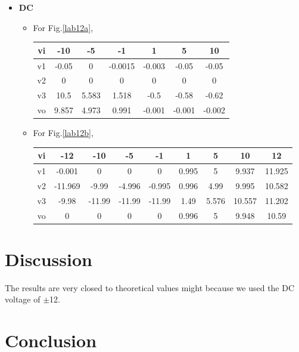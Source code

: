 \begin{itemize}
            \item \textbf{DC}
                \begin{itemize}
                    \item For Fig.\ref{lab12a},\\
                        \begin{table}[h]
                        \centering
                        \begin{tabular}{|c|c|c|c|c|c|c|}
                            \hline
                            vi & -10   & -5    & -1      & 1      & 5      & 10     \\ \hline
                            v1 & -0.05 & 0     & -0.0015 & -0.003 & -0.05  & -0.05  \\ \hline
                            v2 & 0     & 0     & 0       & 0      & 0      & 0      \\ \hline
                            v3 & 10.5  & 5.583 & 1.518   & -0.5   & -0.58  & -0.62  \\ \hline
                            vo & 9.857 & 4.973 & 0.991   & -0.001 & -0.001 & -0.002 \\ \hline
                        \end{tabular}
                        \end{table}
                        \FloatBarrier
                    \item For Fig.\ref{lab12b},\\
                        \begin{table}[h]
                        \centering
                        \begin{tabular}{|c|c|c|c|c|c|c|c|c|}
                            \hline
                            vi & -12     & -10    & -5     & -1     & 1     & 5     & 10     & 12     \\ \hline
                            v1 & -0.001  & 0      & 0      & 0      & 0.995 & 5     & 9.937  & 11.925 \\ \hline
                            v2 & -11.969 & -9.99  & -4.996 & -0.995 & 0.996 & 4.99  & 9.995  & 10.582 \\ \hline
                            v3 & -9.98   & -11.99 & -11.99 & -11.99 & 1.49  & 5.576 & 10.557 & 11.202 \\ \hline
                            vo & 0       & 0      & 0      & 0      & 0.996 & 5     & 9.948  & 10.59  \\ \hline
                        \end{tabular}
                        \end{table}
                        \FloatBarrier
                \end{itemize}
            
        \end{itemize}
\section{Discussion}
    The results are very closed to theoretical values might because we used the DC voltage of $\pm$12.

\section{Conclusion}